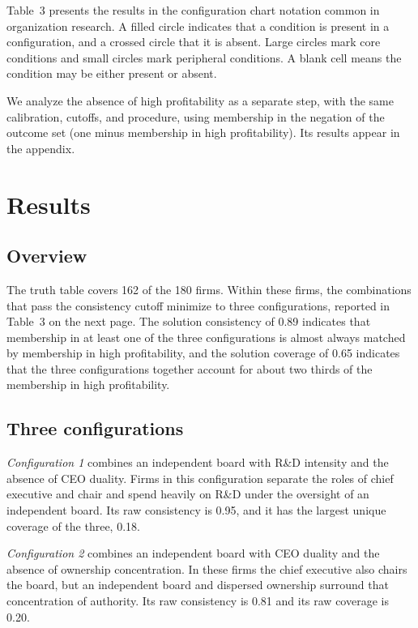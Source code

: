 \documentclass[11pt]{article}
\begin{document}
Table~3 presents the results in the configuration chart notation common in organization research. A filled circle indicates that a condition is present in a configuration, and a crossed circle that it is absent. Large circles mark core conditions and small circles mark peripheral conditions. A blank cell means the condition may be either present or absent.

We analyze the absence of high profitability as a separate step, with the same calibration, cutoffs, and procedure, using membership in the negation of the outcome set (one minus membership in high profitability). Its results appear in the appendix.

\clearpage
\section{Results}

\subsection{Overview}

The truth table covers 162 of the 180 firms. Within these firms, the combinations that pass the consistency cutoff minimize to three configurations, reported in Table~3 on the next page. The solution consistency of 0.89 indicates that membership in at least one of the three configurations is almost always matched by membership in high profitability, and the solution coverage of 0.65 indicates that the three configurations together account for about two thirds of the membership in high profitability.

\subsection{Three configurations}

\emph{Configuration 1} combines an independent board with R\&D intensity and the absence of CEO duality. Firms in this configuration separate the roles of chief executive and chair and spend heavily on R\&D under the oversight of an independent board. Its raw consistency is 0.95, and it has the largest unique coverage of the three, 0.18.

\emph{Configuration 2} combines an independent board with CEO duality and the absence of ownership concentration. In these firms the chief executive also chairs the board, but an independent board and dispersed ownership surround that concentration of authority. Its raw consistency is 0.81 and its raw coverage is 0.20.
\end{document}
